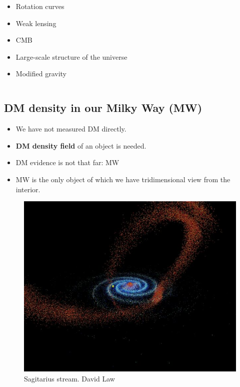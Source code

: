 \documentclass[xcolor=dvipsnames]{beamer}
\begin{document}
\begin{frame}
\begin{columns}[c]
\begin{column}{.5\textwidth}
\centering
\begin{itemize}
\small
\item Rotation curves
\item Weak lensing
\item CMB
\item Large-scale structure of the universe
\item Modified gravity
\end{itemize}
\end{column}

\end{columns}

\end{frame}
\subsection{DM density in our Milky Way (MW)}
\begin{frame}
\begin{itemize}
\small
\item We have not measured DM directly.
\item \textbf{DM density field} of an object is needed.
\item DM evidence is not that far: MW
\item MW is the only object of which we have tridimensional view from the interior.
\end{itemize}

\begin{figure}[c]
\includegraphics[width=0.5\linewidth]{./pics/Sagitarius.jpg}
\caption{\tiny Sagitarius stream. David Law}
\end{figure}

\end{frame}
\end{document}
